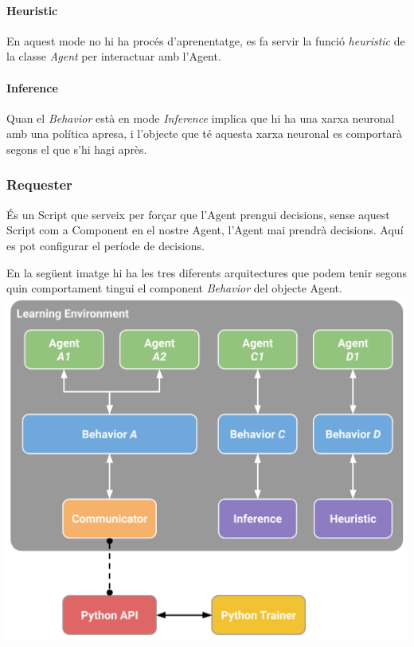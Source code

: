 \documentclass{article}
\begin{document}
    \paragraph{Heuristic}
    En aquest mode no hi ha procés d'aprenentatge, es fa servir la funció \textit{heuristic} de la classe \textit{Agent} per interactuar amb l'Agent.
    
   \paragraph{Inference}
    Quan el \textit{Behavior} està en mode \textit{Inference} implica que hi ha una xarxa neuronal amb una política apresa, i l'objecte que té aquesta xarxa neuronal es comportarà segons el que s'hi hagi après.
    
    \newpage
    
    \subsubsection{Requester}
    És un Script que serveix per forçar que l'Agent prengui decisions, sense aquest Script com a Component en el nostre Agent, l'Agent mai prendrà decisions. Aquí es pot configurar el període de decisions.
    
    En la següent imatge hi ha les tres diferents arquitectures que podem tenir segons quin comportament tingui el component \textit{Behavior} del objecte Agent. \\
    
    \includegraphics[width=\textwidth]{images/arquitecture_mlagent.png}
    
\end{document}
